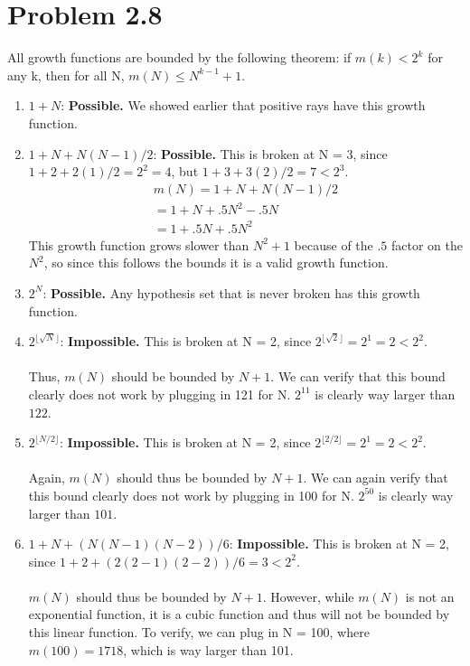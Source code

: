 \documentclass[12pt]{article}
\begin{document}
\section*{Problem 2.8}
All growth functions are bounded by the following theorem: if $m(k) < 2^k$ for any k, then for all N, $m(N) \le N^{k-1} + 1$.
\begin{enumerate}
	\item $1 + N$: \textbf{Possible.} We showed earlier that positive rays have this growth function.
	\item $1 + N + N(N - 1)/2$: \textbf{Possible.} This is broken at N = 3, since $1 + 2 + 2(1)/2 = 2^2 = 4$, but $1 + 3 + 3(2)/2 = 7 < 2^3$.
	\begin{gather*}
		m(N) = 1 + N + N(N - 1)/2
		\\ = 1 + N + .5 N^2 - .5N
		\\ = 1 + .5N + .5N^2
	\end{gather*}
	This growth function grows slower than $N^2 + 1$ because of the $.5$ factor on the $N^2$, so since this follows the bounds it is a valid growth function.
	\item $2^N$: \textbf{Possible.} Any hypothesis set that is never broken has this growth function.
	\item $2^{\lfloor \sqrt{N} \rfloor}$: \textbf{Impossible.} This is broken at N = 2, since $2^{\lfloor \sqrt{2} \rfloor} = 2^1 = 2 < 2^2$.
	\\ \\ Thus, $m(N)$ should be bounded by $N + 1$. We can verify that this bound clearly does not work by plugging in 121 for N. $2^{11}$ is clearly way larger than $122$.
	\item $2^{\lfloor N/2 \rfloor}$: \textbf{Impossible.} This is broken at N = 2, since $2^{\lfloor 2/2 \rfloor} = 2^1 = 2 < 2^2$.
	\\ \\ Again, $m(N)$ should thus be bounded by $N + 1$. We can again verify that this bound clearly does not work by plugging in 100 for N. $2^{50}$ is clearly way larger than $101$.
	\item $1 + N + (N(N-1)(N-2))/6$: \textbf{Impossible.} This is broken at N = 2, since $1 + 2 + (2(2-1)(2-2))/6 = 3 < 2^2$.
	\\ \\ $m(N)$ should thus be bounded by $N + 1$. However, while $m(N)$ is not an exponential function, it is a cubic function and thus will not be bounded by this linear function. To verify, we can plug in N = 100, where $m(100) = 1718$, which is way larger than 101.
\end{enumerate}
\end{document}
